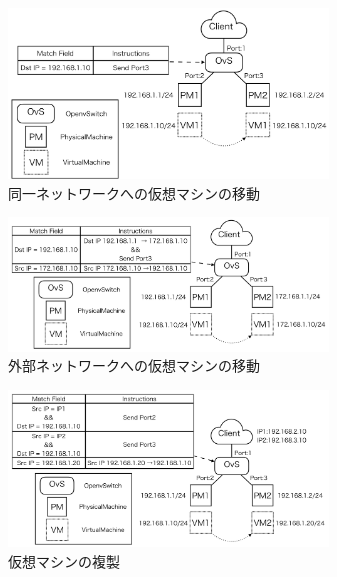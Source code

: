 \documentclass[submit,techrep]{ipsj}
\begin{document}

\begin{figure}[tb]
	\includegraphics[width=8.5cm,bb=0 0 872 468]{fig/migrate_flow.png}
	\caption{同一ネットワークへの仮想マシンの移動}
	\label{fig:migrate_flow}
\end{figure}
\begin{figure}[tb]
	\includegraphics[width=8.5cm,bb=0 0 958 401]{fig/migrate_flow_diff.png}
	\caption{外部ネットワークへの仮想マシンの移動}
	\label{fig:migrate_flow_diff}
\end{figure}
\begin{figure}[tb]
	\includegraphics[width=8.5cm,bb=0 0 955 468]{fig/clone_flow.png}
	\caption{仮想マシンの複製}
	\label{fig:clone_flow}
\end{figure}
\end{document}
